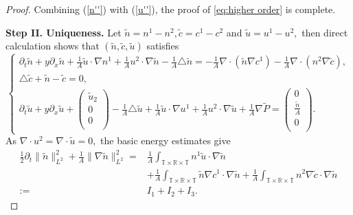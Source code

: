 \documentclass[12pt, reqno]{amsart}
\newtheorem{proposition}{Proposition}[section]
\numberwithin{equation}{section}
\begin{document}
\begin{proof}
		Combining (\ref{n''}) with (\ref{u''}), the proof of \eqref{eq:higher order} is complete.
	
	
	
	
	 {\bf{Step II. Uniqueness.}}
	Let $ \tilde{n}=n^{1}-n^{2}, \tilde{c}=c^{1}-c^{2} $ and $ \tilde{u}=u^{1}-u^{2}, $ then direct calculation shows that $ (\tilde{n},\tilde{c},\tilde{u}) $ satisfies
	\begin{equation}\label{eq:tilde}
	\left\{
	\begin{array}{lr}
	\partial_{t}\tilde{n}+y\partial_{x}\tilde{n}+\frac{1}{A}\tilde{u}\cdot\nabla n^{1}+\frac{1}{A}u^{2}\cdot\nabla\tilde{n}-\frac{1}{A}\triangle\tilde{n}=-\frac{1}{A}\nabla\cdot(\tilde{n}\nabla c^{1})-\frac{1}{A}\nabla\cdot(n^{2}\nabla\tilde{c}), \\
	\triangle\tilde{c}+\tilde{n}-\tilde{c}=0, \\
	\partial_t\tilde{u}+y\partial_x \tilde{u}+\left(
	\begin{array}{c}
	\tilde{u}_{2} \\
	0 \\
	0 \\
	\end{array}
	\right)
	-\frac{1}{A}\triangle\tilde{u}+\frac{1}{A}\tilde{u}\cdot\nabla u^{1}+\frac{1}{A}u^{2}\cdot\nabla\tilde{u}+\frac{1}{A}\nabla \tilde{P}=\left(
	\begin{array}{c}
	0 \\
	\frac{\tilde{n}}{A} \\
	0 \\
	\end{array}
	\right).
	\end{array}
	\right.
	\end{equation}
	As $ \nabla\cdot u^{2}=\nabla\cdot\tilde{u}=0, $ the basic energy estimates give
	\begin{equation}\label{tilde n}
		\begin{aligned}
		\frac12\partial_{t}\|\tilde{n}\|_{L^{2}}^{2}+\frac{1}{A}\|\nabla\tilde{n}\|_{L^{2}}^{2}=&\frac{1}{A}\int_{\mathbb{T}\times\mathbb{R}\times\mathbb{T}}n^{1}\tilde{u}\cdot\nabla\tilde{n}\\&+\frac{1}{A}\int_{\mathbb{T}\times\mathbb{R}\times\mathbb{T}}\tilde{n}\nabla c^{1}\cdot\nabla\tilde{n}+\frac{1}{A}\int_{\mathbb{T}\times\mathbb{R}\times\mathbb{T}}n^{2}\nabla\tilde{c}\cdot\nabla\tilde{n}\\:=&I_{1}+I_{2}+I_{3}.

\end{aligned}
\end{equation}
\end{proof}
\end{document}
